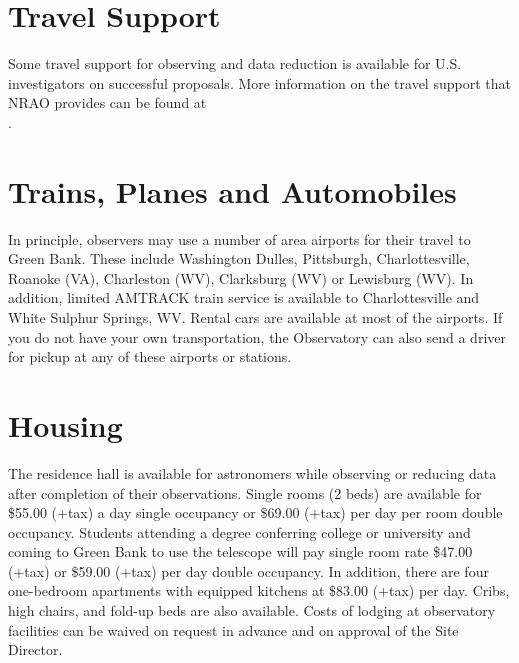 \section{Travel Support}

Some travel support for observing and data reduction is available for U.S. 
investigators on successful proposals. More information on the travel 
support that \gls{NRAO} provides can be found at \\
.

\section{Trains, Planes and Automobiles}

In principle, observers may use a number of area airports for their travel to 
Green Bank.  These include Washington Dulles, Pittsburgh, Charlottesville, 
Roanoke (VA), Charleston (WV), Clarksburg (WV) or Lewisburg (WV). 
In addition, limited AMTRACK train service is available to Charlottesville 
and White Sulphur Springs, WV.  Rental cars are available at most of the 
airports.  If you do not have your own transportation, the Observatory can
also send a driver for pickup at any of these airports or stations.

\section{Housing}

The residence hall is available for astronomers while observing or reducing data
after completion of their observations. Single rooms (2 beds) are available for
\$55.00 (+tax) a day single occupancy or \$69.00 (+tax) per day per room double
occupancy. Students attending a degree conferring college or university and
coming to Green Bank to use the telescope will pay single room rate \$47.00
(+tax) or \$59.00 (+tax) per day double occupancy. In addition,
there are four one-bedroom apartments with equipped kitchens at \$83.00
(+tax) per day. Cribs, high chairs, and fold-up beds are also available. 
Costs of lodging at observatory facilities can be waived on request in advance
and on approval of the Site Director.



